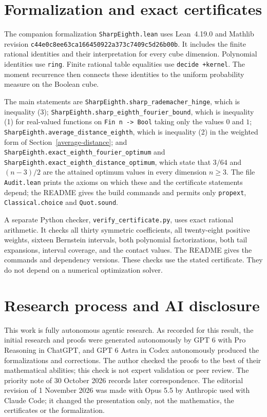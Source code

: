 \documentclass[11pt]{article}
\newcommand{\lean}[1]{{\urlstyle{tt}\nolinkurl{#1}}}
\begin{document}
\section{Formalization and exact certificates}\label{sec:formal}

The companion formalization \texttt{SharpEighth.lean} uses Lean~4.19.0 and Mathlib revision \texttt{c44e0c8ee63ca166450922a373c7409c5d26b00b}. It includes the finite rational identities and their interpretation for every cube dimension. Polynomial identities use \texttt{ring}. Finite rational table equalities use \texttt{decide +kernel}. The moment recurrence then connects these identities to the uniform probability measure on the Boolean cube.

The main statements are \lean{SharpEighth.sharp_rademacher_hinge}, which is inequality (3); \lean{SharpEighth.sharp_eighth_fourier_bound}, which is inequality (1) for real-valued functions on \texttt{Fin n -> Bool} taking only the values \(0\) and \(1\); \lean{SharpEighth.average_distance_eighth}, which is inequality (2) in the weighted form of Section~\ref{average-distance}; and \lean{SharpEighth.exact_eighth_fourier_optimum} and \lean{SharpEighth.exact_eighth_distance_optimum}, which state that \(3/64\) and \((n-3)/2\) are the attained optimum values in every dimension \(n\ge3\). The file \texttt{Audit.lean} prints the axioms on which these and the certificate statements depend; the README gives the build commands and permits only \texttt{propext}, \texttt{Classical.choice} and \texttt{Quot.sound}.

A separate Python checker, \texttt{verify\_certificate.py}, uses exact rational arithmetic. It checks all thirty symmetric coefficients, all twenty-eight positive weights, sixteen Bernstein intervals, both polynomial factorizations, both tail expansions, interval coverage, and the contact values. The README gives the commands and dependency versions. These checks use the stated certificate. They do not depend on a numerical optimization solver.

\section{Research process and AI disclosure}\label{sec:disclosure}

This work is fully autonomous agentic research. As recorded for this result, the initial research and proofs were generated autonomously by GPT 6 with Pro Reasoning in ChatGPT, and GPT 6 Astra in Codex autonomously produced the formalizations and corrections. The author checked the proofs to the best of their mathematical abilities; this check is not expert validation or peer review. The priority note of 30 October 2026 records later correspondence. The editorial revision of 1 November 2026 was made with Opus 5.5 by Anthropic used with Claude Code; it changed the presentation only, not the mathematics, the certificates or the formalization.
\end{document}
